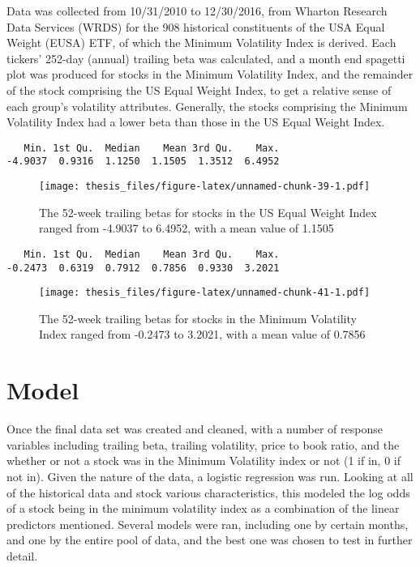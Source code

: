 \documentclass[12pt,twoside]{reedthesis}
\theoremstyle{definition}
\theoremstyle{definition}
\theoremstyle{definition}
\theoremstyle{remark}
\begin{document}
Data was collected from 10/31/2010 to 12/30/2016, from Wharton Research
Data Services (WRDS) for the 908 historical constituents of the USA
Equal Weight (EUSA) ETF, of which the Minimum Volatility Index is
derived. Each tickers' 252-day (annual) trailing beta was calculated,
and a month end spagetti plot was produced for stocks in the Minimum
Volatility Index, and the remainder of the stock comprising the US Equal
Weight Index, to get a relative sense of each group's volatility
attributes. Generally, the stocks comprising the Minimum Volatility
Index had a lower beta than those in the US Equal Weight Index.
\begin{verbatim}
   Min. 1st Qu.  Median    Mean 3rd Qu.    Max. 
-4.9037  0.9316  1.1250  1.1505  1.3512  6.4952 
\end{verbatim}
\begin{figure}[htbp]
\centering
\texttt{[image: thesis\_files/figure-latex/unnamed-chunk-39-1.pdf]}
\caption{\label{fig:unnamed-chunk-39}The 52-week trailing betas for stocks
in the US Equal Weight Index ranged from -4.9037 to 6.4952, with a mean
value of 1.1505}
\end{figure}
\begin{verbatim}
   Min. 1st Qu.  Median    Mean 3rd Qu.    Max. 
-0.2473  0.6319  0.7912  0.7856  0.9330  3.2021 
\end{verbatim}
\begin{figure}[htbp]
\centering
\texttt{[image: thesis\_files/figure-latex/unnamed-chunk-41-1.pdf]}
\caption{\label{fig:unnamed-chunk-41}The 52-week trailing betas for stocks
in the Minimum Volatility Index ranged from -0.2473 to 3.2021, with a
mean value of 0.7856}
\end{figure}
\chapter{Model}\label{model}

Once the final data set was created and cleaned, with a number of
response variables including trailing beta, trailing volatility, price
to book ratio, and the whether or not a stock was in the Minimum
Volatility index or not (1 if in, 0 if not in). Given the nature of the
data, a logistic regression was run. Looking at all of the historical
data and stock various characteristics, this modeled the log odds of a
stock being in the minimum volatility index as a combination of the
linear predictors mentioned. Several models were ran, including one by
certain months, and one by the entire pool of data, and the best one was
chosen to test in further detail.
\end{document}
